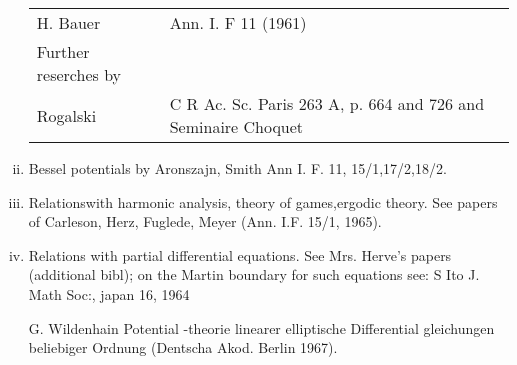 \begin{enumerate}[i)]
  \begin{tabular}{lp{6cm}}
    {H. Bauer} & Ann. I. F 11 (1961)\\ 
    Further reserches by\\
    {Rogalski} & C R Ac. Sc. Paris 263 A, p. 664 and 726 and
    Seminaire Choquet
  \end{tabular}
  
\item Bessel potentials by Aronszajn, Smith Ann I. F. 11,
  15/1,17/2,18/2. 
\item Relations\pageoriginale with harmonic analysis, theory of games,ergodic
  theory. See papers of Carleson, Herz, Fuglede, Meyer
  (Ann. I.F. 15/1, 1965). 
\item Relations with partial differential equations. See Mrs. Herve's
  papers (additional bibl); on the Martin boundary for such equations
  see: S Ito J. Math Soc:, japan 16, 1964  

  G. Wildenhain Potential -theorie linearer elliptische Differential\break
  gleichungen beliebiger Ordnung (Dentscha Akod. Berlin 1967). 
\end{enumerate}


